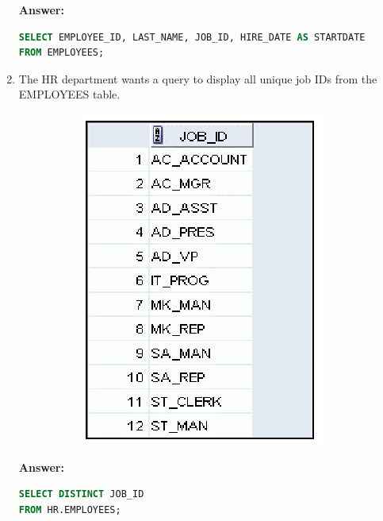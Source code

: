 \documentclass[a4paper,12pt]{article}
\begin{document}
\begin{enumerate}[start=4]
    \textbf{Answer: }
    \begin{lstlisting}[language=SQL]
SELECT EMPLOYEE_ID, LAST_NAME, JOB_ID, HIRE_DATE AS STARTDATE
FROM EMPLOYEES;
    \end{lstlisting}
    
    \newpage
    \item The HR department wants a query to display all unique job IDs from the EMPLOYEES table.
    \begin{figure}[h]
        \centering
        \begin{subfigure}[b]{0.3\linewidth}
            \centering
            \includegraphics[width=\linewidth]{graphics/7.png}
        \end{subfigure}
    \end{figure}
   
    \textbf{Answer: }
    \begin{lstlisting}[language=SQL]
SELECT DISTINCT JOB_ID
FROM HR.EMPLOYEES;
    \end{lstlisting}
    
\end{enumerate}
\end{document}
